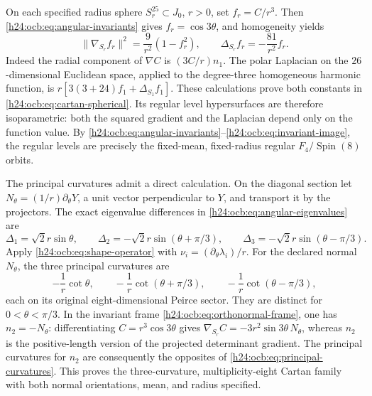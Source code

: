 On each specified radius sphere $S_r^{25}\subset J_0$, $r>0$,
set $f_r=C/r^3$. Then \eqref{h24:ocb:eq:angular-invariants} gives
$f_r=\cos3\theta$, and homogeneity yields
\begin{equation}
 \|\nabla_{S_r}f_r\|^2=\frac9{r^2}(1-f_r^2),\qquad
 \Delta_{S_r}f_r=-\frac{81}{r^2}f_r.
 \label{h24:ocb:eq:cartan-spherical}\tag{OCB30}
\end{equation}
Indeed the radial component of $\nabla C$ is $(3C/r)n_1$.
The polar Laplacian on the $26$-dimensional Euclidean space,
applied to the degree-three homogeneous harmonic function, is
$r[3(3+24)f_1+\Delta_{S_1}f_1]$. These calculations prove both
constants in \eqref{h24:ocb:eq:cartan-spherical}. Its regular level
hypersurfaces are therefore isoparametric: both the squared gradient
and the Laplacian depend only on the function value. By
\eqref{h24:ocb:eq:angular-invariants}--\eqref{h24:ocb:eq:invariant-image},
the regular levels are precisely the fixed-mean, fixed-radius regular
$F_4/\operatorname{Spin}(8)$ orbits.

The principal curvatures admit a direct calculation. On the diagonal
section let $N_\theta=(1/r)\partial_\theta Y$, a unit vector
perpendicular to $Y$, and transport it by the projectors. The exact
eigenvalue differences in \eqref{h24:ocb:eq:angular-eigenvalues} are
\begin{equation}
 \Delta_1=\sqrt2r\sin\theta,\qquad
 \Delta_2=-\sqrt2r\sin(\theta+\pi/3),\qquad
 \Delta_3=-\sqrt2r\sin(\theta-\pi/3).
 \label{h24:ocb:eq:angular-differences}\tag{OCB31}
\end{equation}
Apply \eqref{h24:ocb:eq:shape-operator} with
$\nu_i=(\partial_\theta\lambda_i)/r$. For the declared normal
$N_\theta$, the three principal curvatures are
\begin{equation}
 -\frac1r\cot\theta,\qquad
 -\frac1r\cot(\theta+\pi/3),\qquad
 -\frac1r\cot(\theta-\pi/3),
 \label{h24:ocb:eq:principal-curvatures}\tag{OCB32}
\end{equation}
each on its original eight-dimensional Peirce sector. They are
distinct for $0<\theta<\pi/3$. In the invariant frame
\eqref{h24:ocb:eq:orthonormal-frame}, one has $n_2=-N_\theta$:
differentiating $C=r^3\cos3\theta$ gives
$\nabla_{S_r}C=-3r^2\sin3\theta\,N_\theta$, whereas $n_2$
is the positive-length version of the projected determinant
gradient. The principal curvatures for $n_2$ are consequently the
opposites of \eqref{h24:ocb:eq:principal-curvatures}. This proves the
three-curvature, multiplicity-eight Cartan family with both normal
orientations, mean, and radius specified.

